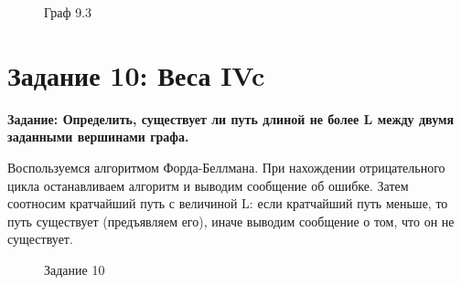 \documentclass[otchet]{SCWorks}
\begin{document}
\begin{figure}[H]
	\caption{Граф 9.3}
	\label{gr9_3}
\end{figure}
\section{Задание 10: Веса IVc}

\textbf{Задание: Определить, существует ли путь длиной не более L между двумя заданными вершинами графа.}

Воспользуемся алгоритмом Форда-Беллмана. При нахождении отрицательного цикла останавливаем алгоритм и выводим сообщение об ошибке. Затем соотносим кратчайший путь с величиной L: если кратчайший путь меньше, то путь существует (предъявляем его), иначе выводим сообщение о том, что он не существует.

\begin{figure}[H]
	\caption{Задание 10}
	\label{pic10_1}
\end{figure}
\end{document}
